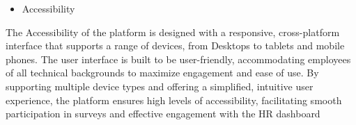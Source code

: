 \documentclass[conference]{IEEEtran}
\begin{document}
    \begin{itemize}
        \item Accessibility
        \end{itemize}

    The Accessibility of the platform is designed with a responsive, 
    cross-platform interface that supports a range of devices, from 
    Desktops to tablets and mobile phones. The user interface is built 
    to be user-friendly, accommodating employees of all technical 
    backgrounds to maximize engagement and ease of use. By supporting 
    multiple device types and offering a simplified, intuitive user 
    experience, the platform ensures high levels of accessibility, 
    facilitating smooth participation in surveys and effective 
    engagement with the HR dashboard
    \newline  \newline  \newline  
\end{document}
